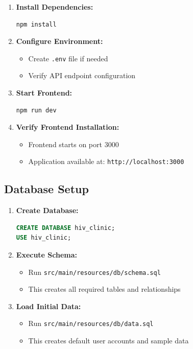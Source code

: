 \documentclass[12pt,a4paper]{article}
\begin{document}
\begin{enumerate}
    \item \textbf{Install Dependencies:}
    \begin{lstlisting}[language=bash]
npm install
    \end{lstlisting}
    
    \item \textbf{Configure Environment:}
    \begin{itemize}
        \item Create \texttt{.env} file if needed
        \item Verify API endpoint configuration
    \end{itemize}
    
    \item \textbf{Start Frontend:}
    \begin{lstlisting}[language=bash]
npm run dev
    \end{lstlisting}
    
    \item \textbf{Verify Frontend Installation:}
    \begin{itemize}
        \item Frontend starts on port 3000
        \item Application available at: \texttt{http://localhost:3000}
    \end{itemize}
\end{enumerate}

\subsection{Database Setup}

\begin{enumerate}
    \item \textbf{Create Database:}
    \begin{lstlisting}[language=sql]
CREATE DATABASE hiv_clinic;
USE hiv_clinic;
    \end{lstlisting}
    
    \item \textbf{Execute Schema:}
    \begin{itemize}
        \item Run \texttt{src/main/resources/db/schema.sql}
        \item This creates all required tables and relationships
    \end{itemize}
    
    \item \textbf{Load Initial Data:}
    \begin{itemize}
        \item Run \texttt{src/main/resources/db/data.sql}
        \item This creates default user accounts and sample data
    \end{itemize}
\end{enumerate}
\end{document}
